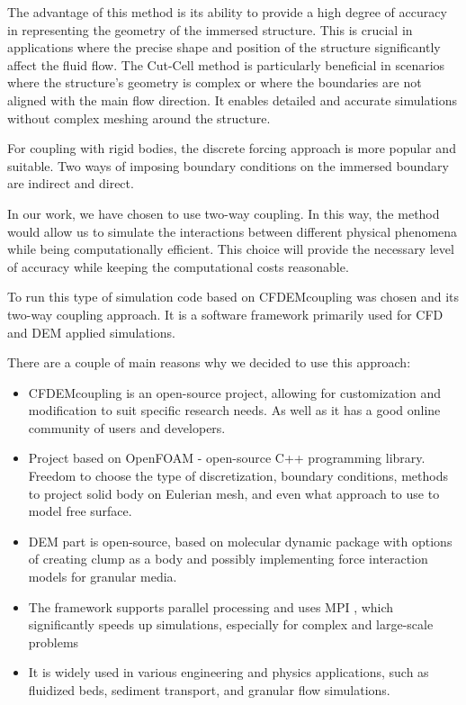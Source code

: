 The advantage of this method is its ability to provide a high degree of accuracy in representing the geometry of the immersed structure. This is crucial in applications where the precise shape and position of the structure significantly affect the fluid flow. The Cut-Cell method is particularly beneficial in scenarios where the structure's geometry is complex or where the boundaries are not aligned with the main flow direction. It enables detailed and accurate simulations without complex meshing around the structure. 

For coupling with rigid bodies, the discrete forcing approach is more popular and suitable. Two ways of imposing boundary conditions on the immersed boundary are indirect and direct.

In our work, we have chosen to use two-way coupling. In this way, the method would allow us to simulate the interactions between different physical phenomena while being computationally efficient. This choice will provide the necessary level of accuracy while keeping the computational costs reasonable.

To run this type of simulation code based on CFDEMcoupling \cite{kloss2011liggghts} was chosen and its two-way coupling approach. 
It is a software framework primarily used for CFD and DEM applied simulations.

There are a couple of main reasons why we decided to use this approach:
\begin{itemize}
    \item CFDEMcoupling is an open-source project, allowing for customization and modification to suit specific research needs. As well as it has a good online community of users and developers.
    \item Project based on OpenFOAM - open-source C++ programming library. Freedom to choose the type of discretization, boundary conditions, methods to project solid body on Eulerian mesh, and even what approach to use to model free surface. 
    \item \ac{DEM} part is open-source, based on molecular dynamic package \cite{LAMMPS} with options of creating clump as a body and possibly implementing force interaction models for granular media.
    \item The framework supports parallel processing and uses \ac{MPI} \cite{MPI}, which significantly speeds up simulations, especially for complex and large-scale problems
    \item It is widely used in various engineering and physics applications, such as fluidized beds, sediment transport, and granular flow simulations.
\end{itemize}

